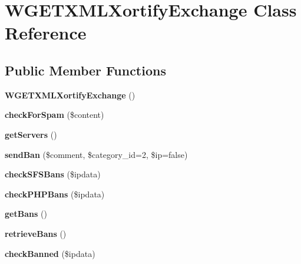 \hypertarget{class_w_g_e_t_x_m_l_xortify_exchange}{\section{W\-G\-E\-T\-X\-M\-L\-Xortify\-Exchange Class Reference}
\label{class_w_g_e_t_x_m_l_xortify_exchange}
}
\subsection*{Public Member Functions}
\begin{DoxyCompactItemize}
\item 
\hypertarget{class_w_g_e_t_x_m_l_xortify_exchange_a7d7e5d1092a075a86ff1edb6bd5a4171}{{\bfseries W\-G\-E\-T\-X\-M\-L\-Xortify\-Exchange} ()}\label{class_w_g_e_t_x_m_l_xortify_exchange_a7d7e5d1092a075a86ff1edb6bd5a4171}

\item 
\hypertarget{class_w_g_e_t_x_m_l_xortify_exchange_a7a4f53c3841dc7806455261af557d514}{{\bfseries check\-For\-Spam} (\$content)}\label{class_w_g_e_t_x_m_l_xortify_exchange_a7a4f53c3841dc7806455261af557d514}

\item 
\hypertarget{class_w_g_e_t_x_m_l_xortify_exchange_a882f365bc81e207dc2123ef707735e82}{{\bfseries get\-Servers} ()}\label{class_w_g_e_t_x_m_l_xortify_exchange_a882f365bc81e207dc2123ef707735e82}

\item 
\hypertarget{class_w_g_e_t_x_m_l_xortify_exchange_a0293acfa4afe0cb5b2816352a35d8ca7}{{\bfseries send\-Ban} (\$comment, \$category\-\_\-id=2, \$ip=false)}\label{class_w_g_e_t_x_m_l_xortify_exchange_a0293acfa4afe0cb5b2816352a35d8ca7}

\item 
\hypertarget{class_w_g_e_t_x_m_l_xortify_exchange_a985a563a84e3e5c54694fcce192bda53}{{\bfseries check\-S\-F\-S\-Bans} (\$ipdata)}\label{class_w_g_e_t_x_m_l_xortify_exchange_a985a563a84e3e5c54694fcce192bda53}

\item 
\hypertarget{class_w_g_e_t_x_m_l_xortify_exchange_aeb1bf9aaee4718870adbd07333490aaf}{{\bfseries check\-P\-H\-P\-Bans} (\$ipdata)}\label{class_w_g_e_t_x_m_l_xortify_exchange_aeb1bf9aaee4718870adbd07333490aaf}

\item 
\hypertarget{class_w_g_e_t_x_m_l_xortify_exchange_aea26db2906896833d32445a698fc4cdc}{{\bfseries get\-Bans} ()}\label{class_w_g_e_t_x_m_l_xortify_exchange_aea26db2906896833d32445a698fc4cdc}

\item 
\hypertarget{class_w_g_e_t_x_m_l_xortify_exchange_a4af29af927aae9aada97ef0c2cd08fa1}{{\bfseries retrieve\-Bans} ()}\label{class_w_g_e_t_x_m_l_xortify_exchange_a4af29af927aae9aada97ef0c2cd08fa1}

\item 
\hypertarget{class_w_g_e_t_x_m_l_xortify_exchange_ae41df0f26620b727f7f63342648f6474}{{\bfseries check\-Banned} (\$ipdata)}\label{class_w_g_e_t_x_m_l_xortify_exchange_ae41df0f26620b727f7f63342648f6474}

\end{DoxyCompactItemize}

